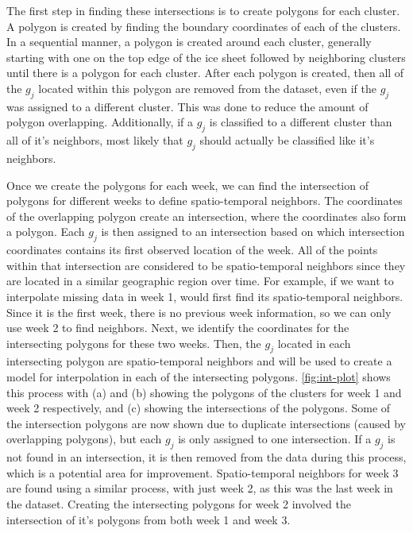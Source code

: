 \documentclass[12pt]{article}
\begin{document}
The first step in finding these intersections is to create polygons for
each cluster. A polygon is created by finding the boundary coordinates
of each of the clusters. In a sequential manner, a polygon is created
around each cluster, generally starting with one on the top edge of the
ice sheet followed by neighboring clusters until there is a polygon for
each cluster. After each polygon is created, then all of the \(g_j\)
located within this polygon are removed from the dataset, even if the
\(g_j\) was assigned to a different cluster. This was done to reduce the
amount of polygon overlapping. Additionally, if a \(g_j\) is classified
to a different cluster than all of it's neighbors, most likely that
\(g_j\) should actually be classified like it's neighbors.

Once we create the polygons for each week, we can find the intersection
of polygons for different weeks to define spatio-temporal neighbors. The
coordinates of the overlapping polygon create an intersection, where the
coordinates also form a polygon. Each \(g_j\) is then assigned to an
intersection based on which intersection coordinates contains its first
observed location of the week. All of the points within that
intersection are considered to be spatio-temporal neighbors since they
are located in a similar geographic region over time. For example, if we
want to interpolate missing data in week 1, would first find its
spatio-temporal neighbors. Since it is the first week, there is no
previous week information, so we can only use week 2 to find neighbors.
Next, we identify the coordinates for the intersecting polygons for
these two weeks. Then, the \(g_j\) located in each intersecting polygon
are spatio-temporal neighbors and will be used to create a model for
interpolation in each of the intersecting polygons. \cref{fig:int-plot}
shows this process with (a) and (b) showing the polygons of the clusters
for week 1 and week 2 respectively, and (c) showing the intersections of
the polygons. Some of the intersection polygons are now shown due to
duplicate intersections (caused by overlapping polygons), but each
\(g_j\) is only assigned to one intersection. If a \(g_j\) is not found
in an intersection, it is then removed from the data during this
process, which is a potential area for improvement. Spatio-temporal
neighbors for week 3 are found using a similar process, with just week
2, as this was the last week in the dataset. Creating the intersecting
polygons for week 2 involved the intersection of it's polygons from both
week 1 and week 3.
\end{document}
